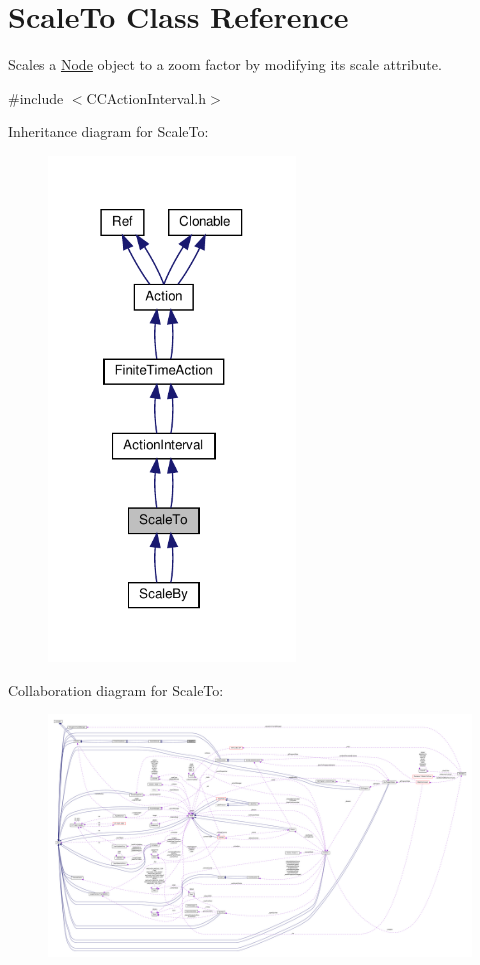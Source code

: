 \hypertarget{classScaleTo}{}\section{Scale\+To Class Reference}
\label{classScaleTo}


Scales a \hyperlink{classNode}{Node} object to a zoom factor by modifying it\textquotesingle{}s scale attribute.  




{\ttfamily \#include $<$C\+C\+Action\+Interval.\+h$>$}



Inheritance diagram for Scale\+To\+:
\nopagebreak
\begin{figure}[H]
\begin{center}
\leavevmode
\includegraphics[width=186pt]{classScaleTo__inherit__graph}
\end{center}
\end{figure}


Collaboration diagram for Scale\+To\+:
\nopagebreak
\begin{figure}[H]
\begin{center}
\leavevmode
\includegraphics[width=350pt]{classScaleTo__coll__graph}
\end{center}
\end{figure}
